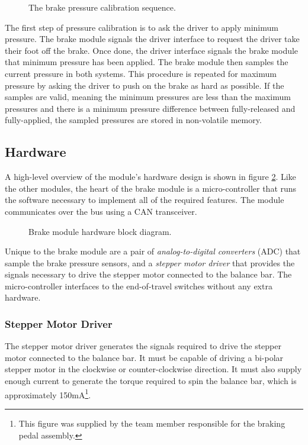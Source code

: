 \begin{figure}[H]
	\centering
	
	\caption{The brake pressure calibration sequence.}
	\label{fig:brake_pressure_calibration_flow}
\end{figure}

The first step of pressure calibration is to ask the driver to apply minimum pressure. The brake module signals the driver interface to request the driver take their foot off the brake. Once done, the driver interface signals the brake module that minimum pressure has been applied. The brake module then samples the current pressure in both systems. This procedure is repeated for maximum pressure by asking the driver to push on the brake as hard as possible. If the samples are valid, meaning the minimum pressures are less than the maximum pressures and there is a minimum pressure difference between fully-released and fully-applied, the sampled pressures are stored in non-volatile memory.

\subsection{Hardware}

A high-level overview of the module's hardware design is shown in figure \ref{fig:brake_hardware_design_block}. Like the other modules, the heart of the brake module is a micro-controller that runs the software necessary to implement all of the required features. The module communicates over the bus using a CAN transceiver. 

\begin{figure}[H]
\centering

\caption{Brake module hardware block diagram.}
\label{fig:brake_hardware_design_block}
\end{figure}

Unique to the brake module are a pair of \emph{analog-to-digital converters} (ADC) that sample the brake pressure sensors, and a \emph{stepper motor driver} that provides the signals necessary to drive the stepper motor connected to the balance bar. The micro-controller  interfaces to the end-of-travel switches without any extra hardware.

\subsubsection{Stepper Motor Driver}

The stepper motor driver generates the signals required to drive the stepper motor connected to the balance bar. It must be capable of  driving a bi-polar stepper motor in the clockwise or counter-clockwise direction. It must also supply enough current to generate the torque required to spin the balance bar, which is approximately \unit{150}{mA}\footnote{This figure was supplied by the team member responsible for the braking pedal assembly.}.

